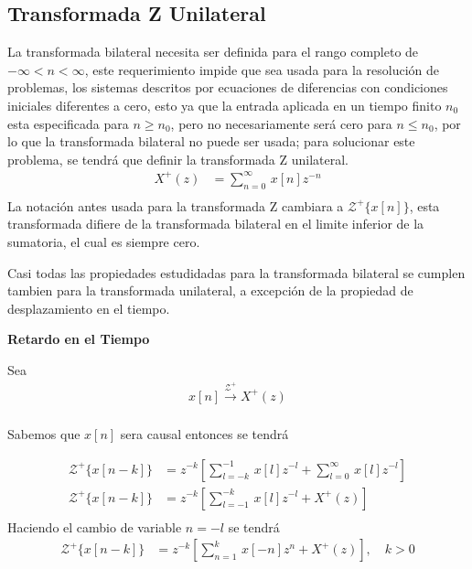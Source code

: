 \documentclass[12pt]{article}
\begin{document}
\subsection{Transformada Z Unilateral}
La transformada bilateral necesita ser definida para el rango completo de $-\infty<n<\infty$, este requerimiento impide que sea usada para la resolución de problemas, los sistemas descritos por ecuaciones de diferencias con condiciones iniciales diferentes a cero, esto ya que la entrada aplicada en un tiempo finito $n_{0}$ esta especificada para $n\ge n_{0}$, pero no necesariamente será cero para $n\le n_{0}$, por lo que la transformada bilateral no puede ser usada; para solucionar este problema, se tendrá que definir la transformada Z unilateral. \cite{proakis1996digital}
\begin{equation}
    \begin{split}
        X^+(z)&=\displaystyle\sum_{n=0}^{\infty}\,x[n]z^{-n}\\
    \end{split}
    \label{eq:zt_unilateral}
\end{equation}
La notación antes usada para la transformada Z cambiara a $\mathscr{Z}^+\{x[n]\}$, esta transformada difiere de la transformada bilateral en el limite inferior de la sumatoria, el cual es siempre cero.

Casi todas las propiedades estudidadas para la transformada bilateral se cumplen tambien para la transformada unilateral, a excepción de la propiedad de desplazamiento en el tiempo.

\textbf{Retardo en el Tiempo}
\vspace{5mm}

Sea 
\begin{equation}
    \begin{split}
        x[n]\xrightarrow{\mathscr{Z}^+}X^+(z)\\
    \end{split}
    \label{eq:uzt_delay}
\end{equation}

Sabemos que $x[n]$ sera causal entonces se tendrá

\begin{equation}
    \begin{split}
        \mathscr{Z}^+\{x[n-k]\}&=z^{-k}[\displaystyle\sum_{l=-k}^{-1}\,x[l]z^{-l}+\displaystyle\sum_{l=0}^{\infty}\,x[l]z^{-l}]\\
        \mathscr{Z}^+\{x[n-k]\}&=z^{-k}[\displaystyle\sum_{l=-1}^{-k}\,x[l]z^{-l}+X^+(z)]\\
    \end{split}
    \label{eq:uzt_delay1}
\end{equation}
Haciendo el cambio de variable $n=-l$ se tendrá
\begin{equation}
    \begin{split}
        \mathscr{Z}^+\{x[n-k]\}&=z^{-k}[\displaystyle\sum_{n=1}^{k}\,x[-n]z^{n}+X^+(z)], \quad k>0\\
    \end{split}
    \label{eq:uzt_delay2}
\end{equation}
\end{document}
